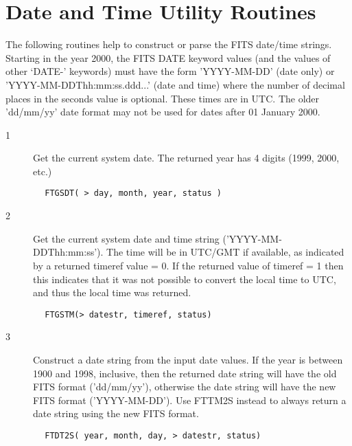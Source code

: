 \documentclass[11pt]{book}
\begin{document}
\section{ Date and Time Utility Routines \label{FTGSDT}}

The following routines help to construct or parse the FITS date/time
strings.   Starting in the year 2000, the FITS DATE keyword values (and
the values of other `DATE-' keywords) must have the form 'YYYY-MM-DD'
(date only) or 'YYYY-MM-DDThh:mm:ss.ddd...' (date and time) where the
number of decimal places in the seconds value is optional.  These times
are in UTC.  The older 'dd/mm/yy' date format may not be used for dates
after 01 January 2000.


\begin{description}
\item[1 ] Get the current system date.  The returned year has 4 digits
    (1999, 2000, etc.)
\end{description}

\begin{verbatim}
        FTGSDT( > day, month, year, status )
\end{verbatim}


\begin{description}
\item[2 ] Get the current system date and time string ('YYYY-MM-DDThh:mm:ss').
The time will be in UTC/GMT if available, as indicated by a returned timeref
value = 0.  If the returned value of timeref = 1 then this indicates that
it was not possible to convert the local time to UTC, and thus the local
time was returned.
\end{description}

\begin{verbatim}
        FTGSTM(> datestr, timeref, status)
\end{verbatim}


\begin{description}
\item[3 ] Construct a date string from the input date values.  If the year
is between 1900 and 1998, inclusive, then the returned date string will
have the old FITS format ('dd/mm/yy'), otherwise the date string will
have the new FITS format ('YYYY-MM-DD').  Use FTTM2S instead
 to always return a date string using the new FITS format.
\end{description}

\begin{verbatim}
        FTDT2S( year, month, day, > datestr, status)
\end{verbatim}
\end{document}
